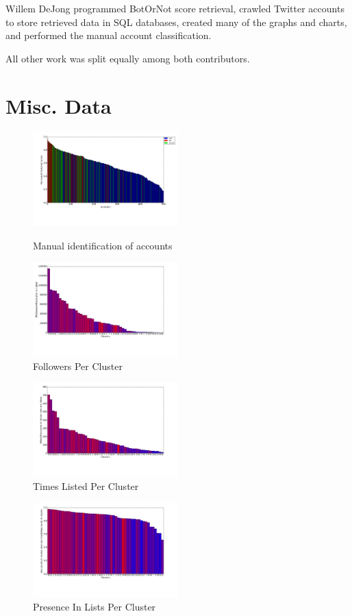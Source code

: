 \documentclass{sig-alternate-05-2015}
\begin{document}
Willem DeJong programmed BotOrNot score retrieval, crawled Twitter accounts to store retrieved data in SQL databases, created many of the graphs and charts, and performed the manual account classification.

All other work was split equally among both contributors.

\section{Misc. Data}

\begin{figure}[h!]
	\caption{Manual identification of accounts}
	\centering
		\includegraphics[width=0.5\textwidth]{imgs/barvsaccnt}
	\label{fig:barvsaccnt}
\end{figure}

\begin{figure}[h!]
	\caption{Followers Per Cluster}
	\centering
		\includegraphics[width=0.5\textwidth]{imgs/followers}
\end{figure}

\begin{figure}[h!]
	\caption{Times Listed Per Cluster}
	\centering
		\includegraphics[width=0.5\textwidth]{imgs/listed2}
\end{figure}

\begin{figure}[h!]
	\caption{Presence In Lists Per Cluster}
	\centering
		\includegraphics[width=0.5\textwidth]{imgs/listed3}
\end{figure}

\end{document}
